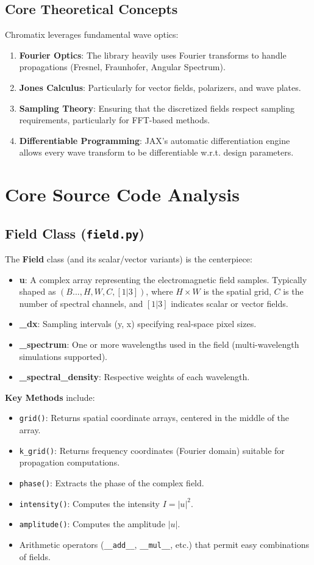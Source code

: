 \documentclass[a4paper,12pt]{report}
\begin{document}
\section{Core Theoretical Concepts}
Chromatix leverages fundamental wave optics:
\begin{enumerate}
    \item \textbf{Fourier Optics}: The library heavily uses Fourier transforms to handle propagations (Fresnel, Fraunhofer, Angular Spectrum).
    \item \textbf{Jones Calculus}: Particularly for vector fields, polarizers, and wave plates.
    \item \textbf{Sampling Theory}: Ensuring that the discretized fields respect sampling requirements, particularly for FFT-based methods.
    \item \textbf{Differentiable Programming}: JAX's automatic differentiation engine allows every wave transform to be differentiable w.r.t. design parameters.
\end{enumerate}

\chapter{Core Source Code Analysis}
\section{Field Class (\texttt{field.py})}
The \textbf{Field} class (and its scalar/vector variants) is the centerpiece:
\begin{itemize}
    \item \textbf{u}: A complex array representing the electromagnetic field samples. Typically shaped as $(B..., H, W, C, [1|3])$, where $H\times W$ is the spatial grid, $C$ is the number of spectral channels, and $[1|3]$ indicates scalar or vector fields.
    \item \textbf{\_dx}: Sampling intervals (y, x) specifying real-space pixel sizes.
    \item \textbf{\_spectrum}: One or more wavelengths used in the field (multi-wavelength simulations supported).
    \item \textbf{\_spectral\_density}: Respective weights of each wavelength.
\end{itemize}
\noindent \textbf{Key Methods} include:
\begin{itemize}
    \item \texttt{grid()}: Returns spatial coordinate arrays, centered in the middle of the array.
    \item \texttt{k\_grid()}: Returns frequency coordinates (Fourier domain) suitable for propagation computations.
    \item \texttt{phase()}: Extracts the phase of the complex field.
    \item \texttt{intensity()}: Computes the intensity $I=|u|^2$.
    \item \texttt{amplitude()}: Computes the amplitude $|u|$.
    \item Arithmetic operators (\texttt{\_\_add\_\_}, \texttt{\_\_mul\_\_}, etc.) that permit easy combinations of fields.
\end{itemize}
\end{document}
